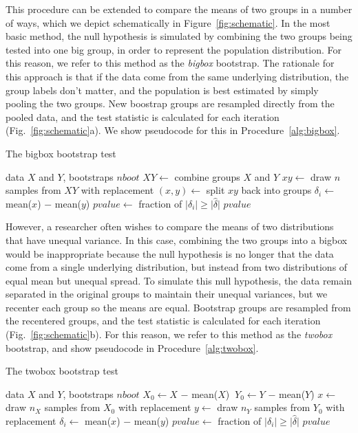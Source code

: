 \documentclass[10pt]{article} %
\begin{document}
This procedure can be extended to compare the means of two groups in a number of ways, which we depict schematically in Figure~\ref{fig:schematic}. In the most basic method, the null hypothesis is simulated by combining the two groups being tested into one big group, in order to represent the population distribution. For this reason, we refer to this method as the \emph{bigbox} bootstrap. The rationale for this approach is that if the data come from the same underlying distribution, the group labels don't matter, and the population is best estimated by simply pooling the two groups. New boostrap groups are resampled directly from the pooled data, and the test statistic is calculated for each iteration (Fig.~\ref{fig:schematic}a). We show pseudocode for this in Procedure~\ref{alg:bigbox}.

\begin{algorithm}
\caption{The bigbox bootstrap test}
\label{alg:bigbox}
\begin{algorithmic} 
\REQUIRE data  $X$ and $Y$, bootstraps $nboot$
\STATE $XY \leftarrow$ combine groups $X$ and $Y$
\STATE $xy \leftarrow$ draw $n$ samples from $XY$ with replacement
 \STATE $(x,y) \leftarrow$ split $xy$ back into groups
 \STATE $\delta_i \leftarrow$ mean($x$) $-$ mean($y$)
 \ENDFOR
 \STATE $pvalue \leftarrow$ fraction of $\lvert \delta_i \rvert \geq \lvert \hat{\delta} \rvert$
 \ENSURE $pvalue$
\end{algorithmic}
\end{algorithm}



However, a researcher often wishes to compare the means of two distributions that have unequal variance. In this case, combining the two groups into a bigbox would be inappropriate because the null hypothesis is no longer that the data come from a single underlying distribution, but instead from two distributions of equal mean but unequal spread. To simulate this null hypothesis, the data remain separated in the original groups to maintain their unequal variances, but we recenter each group so the means are equal. Bootstrap groups are resampled from the recentered groups, and the test statistic is calculated for each iteration (Fig.~\ref{fig:schematic}b). For this reason, we refer to this method as the \emph{twobox} bootstrap, and show pseudocode in Procedure~\ref{alg:twobox}.


\begin{algorithm}
\caption{The twobox bootstrap test}
\label{alg:twobox}
\begin{algorithmic} 
\REQUIRE data $X$ and $Y$, bootstraps $nboot$
\STATE $X_0 \leftarrow X $ $-$ mean($X$) 
\STATE $~Y_0  \leftarrow Y $ $-$ mean($Y$) 
 \STATE $x \leftarrow$ draw $n_X$ samples from $X_0$ with replacement
 \STATE $y \leftarrow$ draw $n_Y$ samples from $Y_0$ with replacement
 \STATE $\delta_i \leftarrow$ mean($x$) $-$ mean($y$)
 \ENDFOR
 \STATE $pvalue \leftarrow$ fraction of $\lvert \delta_i \rvert \geq \lvert \hat{\delta} \rvert$
\ENSURE $pvalue$
\end{algorithmic}
\end{algorithm}
\end{document}
